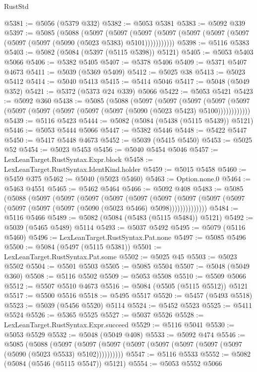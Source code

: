 \begin{lexlean}{RustStd}
\begin{coremodule}
@5381 := @5056 (@5379 @332)
@5382 := @5053 @5381
@5383 := @5092 @339
@5397 := @5085
    (@5088
      (@5097
        (@5097
          (@5097 (@5097 (@5097 (@5097 (@5097 (@5097 (@5097 (@5090 (@5023 @5383) @5101)))))))))))
@5398 := @5116 @5383
@5403 := @5082 (@5084 (@5397 (@5115 @5398)) @5121)
@5405 := @5053 @5403 @5066
@5406 := @5382 @5405
@5407 := @5378 @5406
@5409 := @5371 @5407 @4673
@5411 := @5039 (@5369 @5409)
@5412 := @5025 @38
@5413 := @5023 @5412
@5414 := @5040 @5413
@5415 := @5414 @5046
@5417 := @5048 (@5049 @352)
@5421 := @5372 (@5373 @24 @339) @5066
@5422 := @5053 @5421
@5423 := @5092 @360
@5438 := @5085
    (@5088
      (@5097
        (@5097
          (@5097
            (@5097 (@5097 (@5097 (@5097 (@5097 (@5097 (@5097 (@5090 (@5023 @5423) @5100))))))))))))
@5439 := @5116 @5423
@5444 := @5082 (@5084 (@5438 (@5115 @5439)) @5121)
@5446 := @5053 @5444 @5066
@5447 := @5382 @5446
@5448 := @5422 @5447
@5450 := @5417 @5448 @4673
@5452 := @5039 (@5415 @5450)
@5453 := @5025 @52
@5454 := @5023 @5453
@5456 := @5040 @5454 @5046
@5457 := LexLeanTarget.RustSyntax.Expr.block
@5458 := LexLeanTarget.RustSyntax.IdentKind.holder
@5459 := @5015 @5458
@5460 := @5459 @375
@5462 := @5040 (@5023 @5460)
@5463 := Option.none.{0}
@5464 := @5463 @4551
@5465 := @5462 @5464
@5466 := @5092 @408
@5483 := @5085
    (@5088
      (@5097
        (@5097
          (@5097
            (@5097
              (@5097
                (@5097
                  (@5097 (@5097 (@5097 (@5097 (@5097 (@5097 (@5090 (@5023 @5466) @5098))))))))))))))
@5484 := @5116 @5466
@5489 := @5082 (@5084 (@5483 (@5115 @5484)) @5121)
@5492 := @5039 (@5465 @5489) @5114
@5493 := @5037 @5492
@5495 := @5079 (@5116 @5460)
@5496 := LexLeanTarget.RustSyntax.Pat.none
@5497 := @5085 @5496
@5500 := @5084 (@5497 (@5115 @5381))
@5501 := LexLeanTarget.RustSyntax.Pat.some
@5502 := @5025 @45
@5503 := @5023 @5502
@5504 := @5501 @5503
@5505 := @5085 @5504
@5507 := @5048 (@5049 @360)
@5508 := @5116 @5502
@5509 := @5053 @5508
@5510 := @5509 @5066
@5512 := @5507 @5510 @4673
@5516 := @5084 (@5505 (@5115 @5512)) @5121
@5517 := @5500 @5516
@5518 := @5495 @5517
@5520 := @5457 (@5493 @5518)
@5523 := @5039 (@5456 @5520) @5114
@5524 := @5452 @5523
@5525 := @5411 @5524
@5526 := @5365 @5525
@5527 := @5037 @5526
@5528 := LexLeanTarget.RustSyntax.Expr.succeed
@5529 := @5116 @5041
@5530 := @5053 @5529
@5532 := @5048 (@5049 @408)
@5533 := @5092 @474
@5546 := @5085
    (@5088
      (@5097 (@5097 (@5097 (@5097 (@5097 (@5097 (@5097 (@5097 (@5090 (@5023 @5533) @5102))))))))))
@5547 := @5116 @5533
@5552 := @5082 (@5084 (@5546 (@5115 @5547)) @5121)
@5554 := @5053 @5552 @5066

\end{coremodule}
\end{lexlean}
